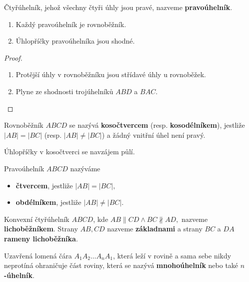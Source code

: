 \begin{definition}
  Čtyřúhelník, jehož všechny čtyři úhly jsou pravé, nazveme \textbf{pravoúhelník}.
\end{definition}

\begin{veta}
  \begin{enumerate}[$i.$]
    \item Každý pravoúhelník je rovnoběžník.
    \item Úhlopříčky pravoúhelníka jsou shodné.
  \end{enumerate}
\end{veta}

\begin{proof}
  \begin{enumerate}[$i.$]
    \item Protější úhly v rovnoběžníku jsou střídavé úhly u rovnoběžek.
    \item Plyne ze shodnosti trojúhelníků $ABD$ a $BAC$.\qedhere
  \end{enumerate}
\end{proof}

\begin{definition}
  Rovnoběžník $ABCD$ se nazývá \textbf{kosočtvercem} (resp. \textbf{kosodélníkem}), jestliže $|AB|=|BC|$ (resp. $|AB| \neq |BC|$) a žádný vnitřní úhel není pravý.
\end{definition}


\begin{veta}
  Úhlopříčky v kosočtverci se navzájem půlí.
\end{veta}

\begin{definition}
  Pravoúhelník $ABCD$ nazýváme
  \begin{itemize}
    \item \textbf{čtvercem}, jestliže $|AB|=|BC|,$
    \item \textbf{obdélníkem}, jestliže $|AB| \ne |BC|$.
  \end{itemize}
\end{definition}

\begin{definition}
  Konvexní čtyřúhelník $ABCD$, kde $AB \parallel CD \land BC \nparallel AD,$ nazveme \textbf{lichoběžníkem}. Strany $AB, CD$ nazveme \textbf{základnami} a strany $BC$ a $DA$ \textbf{rameny lichoběžníka}.
\end{definition}

\begin{definition}
  Uzavřená lomená čára $A_1A_2\dots A_nA_1$, která leží v rovině a sama sebe nikdy neprotíná ohraničuje část roviny, která se nazývá \textbf{mnohoúhelník} nebo také \textbf{$n$-úhelník}.
\end{definition}

